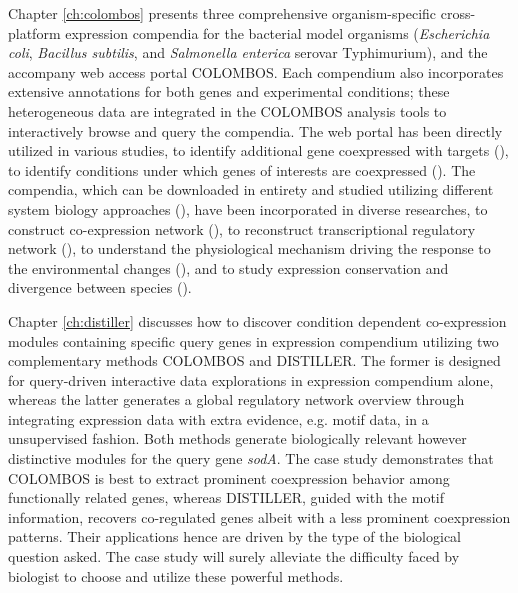Chapter \ref{ch:colombos} presents three comprehensive organism-specific 
cross-platform expression compendia for the bacterial model organisms 
(\textit{Escherichia coli}, \textit{Bacillus subtilis}, and \textit{Salmonella 
enterica} serovar Typhimurium), and the accompany web access portal COLOMBOS.
%
Each compendium also incorporates extensive annotations for both genes and 
experimental conditions; these heterogeneous data are integrated 
in the COLOMBOS analysis tools to interactively browse and query the 
compendia. 
%
The web portal has been directly utilized in various studies, to identify 
additional gene coexpressed with targets (\cite{Meysman2011, Fu2012, 
Meysman2014a}), to identify conditions under which genes of 
interests are coexpressed (\cite{Desai2013}).  
%
The compendia, which can be downloaded in entirety and studied 
utilizing different system biology approaches (\cite{Lemmens2009, Michoel2009, 
Zhao2011, DeSmet2011, Zarrineh2011}), have been incorporated in diverse 
researches, to construct co-expression network (\cite{Cloots2011, Kolar2012}), 
to reconstruct transcriptional regulatory network (\cite{Faria2013}), to 
understand the physiological mechanism driving the response to the 
environmental changes (\cite{Balderas-Martinez2013}), and to study expression 
conservation and divergence between species (\cite{Meysman2013}).
%
%



Chapter \ref{ch:distiller} discusses how to discover condition 
dependent co-expression modules containing specific query genes in expression 
compendium utilizing two complementary methods COLOMBOS and DISTILLER.
%
The former is designed for query-driven interactive data explorations in 
expression compendium alone, whereas the latter generates a global regulatory 
network overview through integrating expression data with extra evidence, e.g. 
motif data, in a unsupervised fashion.
%
Both methods generate biologically relevant however distinctive modules for the 
query gene \textit{sodA}.
%
The case study demonstrates that COLOMBOS is best to extract prominent 
coexpression behavior among functionally related genes, whereas DISTILLER, 
guided with the motif information, recovers co-regulated genes albeit with a 
less prominent coexpression patterns.
%
Their applications hence are driven by the type of the biological question 
asked.
%
The case study will surely alleviate the difficulty faced by biologist to 
choose and utilize these powerful methods.



